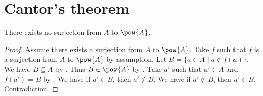 


\section{Cantor's theorem}


\begin{theorem}[Cantor]\label{cantor}
    There exists no surjection from $A$ to $\pow{A}$.
\end{theorem}
\begin{proof}
    Assume there exists a surjection from $A$ to $\pow{A}$.
    Take $f$ such that $f$ is a surjection from $A$ to $\pow{A}$ by assumption.
    Let $B = \{a \in A \mid a\notin f(a)\}$.
    We have $B\subseteq A$ by .
    Thus $B\in\pow{A}$ by .
    Take $a'$ such that $a'\in A$ and $f(a') = B$ by .
    We have if $a'\in B$, then $a'\notin B$.
    We have if $a'\notin B$, then $a'\in B$.
    Contradiction.
\end{proof}
